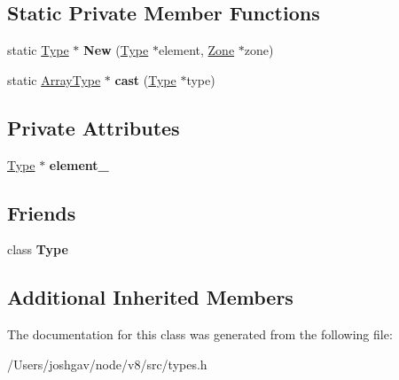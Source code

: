\subsection*{Static Private Member Functions}
\begin{DoxyCompactItemize}
\item 
static \hyperlink{classv8_1_1internal_1_1_type}{Type} $\ast$ {\bfseries New} (\hyperlink{classv8_1_1internal_1_1_type}{Type} $\ast$element, \hyperlink{classv8_1_1internal_1_1_zone}{Zone} $\ast$zone)\hypertarget{classv8_1_1internal_1_1_array_type_a3318cc2a49161892cc0a07a748bda56c}{}\label{classv8_1_1internal_1_1_array_type_a3318cc2a49161892cc0a07a748bda56c}

\item 
static \hyperlink{classv8_1_1internal_1_1_array_type}{Array\+Type} $\ast$ {\bfseries cast} (\hyperlink{classv8_1_1internal_1_1_type}{Type} $\ast$type)\hypertarget{classv8_1_1internal_1_1_array_type_a51804fcd61025e38b554d53fb6953f36}{}\label{classv8_1_1internal_1_1_array_type_a51804fcd61025e38b554d53fb6953f36}

\end{DoxyCompactItemize}
\subsection*{Private Attributes}
\begin{DoxyCompactItemize}
\item 
\hyperlink{classv8_1_1internal_1_1_type}{Type} $\ast$ {\bfseries element\+\_\+}\hypertarget{classv8_1_1internal_1_1_array_type_aa80812e86e5a33e3d89a4b496a085529}{}\label{classv8_1_1internal_1_1_array_type_aa80812e86e5a33e3d89a4b496a085529}

\end{DoxyCompactItemize}
\subsection*{Friends}
\begin{DoxyCompactItemize}
\item 
class {\bfseries Type}\hypertarget{classv8_1_1internal_1_1_array_type_a18dba29b4f3e91d6d2bc53472a6bb7cc}{}\label{classv8_1_1internal_1_1_array_type_a18dba29b4f3e91d6d2bc53472a6bb7cc}

\end{DoxyCompactItemize}
\subsection*{Additional Inherited Members}


The documentation for this class was generated from the following file\+:\begin{DoxyCompactItemize}
\item 
/\+Users/joshgav/node/v8/src/types.\+h\end{DoxyCompactItemize}
